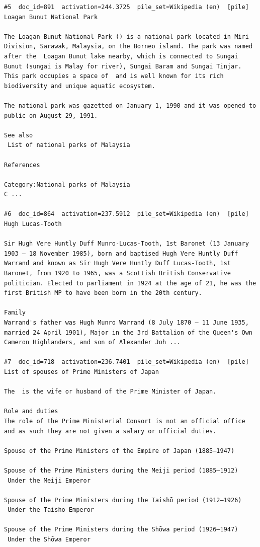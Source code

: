 \begin{verbatim}
#5  doc_id=891  activation=244.3725  pile_set=Wikipedia (en)  [pile]
Loagan Bunut National Park

The Loagan Bunut National Park () is a national park located in Miri Division, Sarawak, Malaysia, on the Borneo island. The park was named after the  Loagan Bunut lake nearby, which is connected to Sungai Bunut (sungai is Malay for river), Sungai Baram and Sungai Tinjar. This park occupies a space of  and is well known for its rich biodiversity and unique aquatic ecosystem.

The national park was gazetted on January 1, 1990 and it was opened to public on August 29, 1991.

See also
 List of national parks of Malaysia

References

Category:National parks of Malaysia
C ...

#6  doc_id=864  activation=237.5912  pile_set=Wikipedia (en)  [pile]
Hugh Lucas-Tooth

Sir Hugh Vere Huntly Duff Munro-Lucas-Tooth, 1st Baronet (13 January 1903 – 18 November 1985), born and baptised Hugh Vere Huntly Duff Warrand and known as Sir Hugh Vere Huntly Duff Lucas-Tooth, 1st Baronet, from 1920 to 1965, was a Scottish British Conservative politician. Elected to parliament in 1924 at the age of 21, he was the first British MP to have been born in the 20th century.

Family
Warrand's father was Hugh Munro Warrand (8 July 1870 – 11 June 1935, married 24 April 1901), Major in the 3rd Battalion of the Queen's Own Cameron Highlanders, and son of Alexander Joh ...

#7  doc_id=718  activation=236.7401  pile_set=Wikipedia (en)  [pile]
List of spouses of Prime Ministers of Japan

The  is the wife or husband of the Prime Minister of Japan.

Role and duties
The role of the Prime Ministerial Consort is not an official office and as such they are not given a salary or official duties.

Spouse of the Prime Ministers of the Empire of Japan (1885–1947)

Spouse of the Prime Ministers during the Meiji period (1885–1912)
 Under the Meiji Emperor

Spouse of the Prime Ministers during the Taishō period (1912–1926)
 Under the Taishō Emperor

Spouse of the Prime Ministers during the Shōwa period (1926–1947)
 Under the Shōwa Emperor


\end{verbatim}
